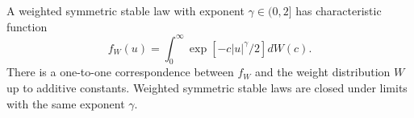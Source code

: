 A weighted symmetric stable law with exponent $\gamma \in (0, 2]$ has characteristic function
$$f_W(u) = \int_0^\infty \exp\left[ -c|u|^\gamma / 2 \right] dW(c).$$
There is a one-to-one correspondence between $f_W$ and the weight distribution $W$ up to additive constants. Weighted symmetric stable laws are closed under limits with the same exponent $\gamma$.
